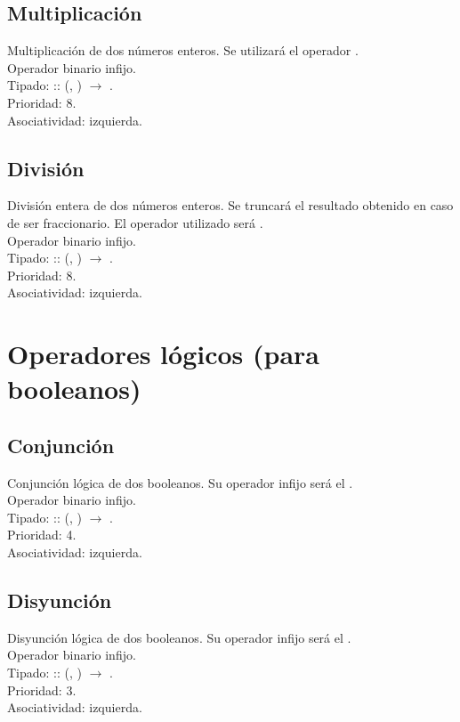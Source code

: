 \subsection*{Multiplicación}
Multiplicación de dos números enteros. Se utilizará el operador \Mul. 
\\Operador  binario infijo.
\\Tipado: \Mul :: (\Integer, \Integer) $\rightarrow$  \Integer. \\Prioridad: 8.
\\Asociatividad: izquierda.

\subsection*{División}
División entera de dos números enteros. Se truncará el resultado obtenido en caso de ser fraccionario. El operador utilizado será \Div. 
\\Operador  binario infijo.
\\Tipado: \Div :: 
(\Integer, \Integer) $\rightarrow$  \Integer. \\Prioridad: 8.
\\Asociatividad: izquierda.

\section{Operadores lógicos (para booleanos)}

\subsection*{Conjunción}
Conjunción lógica de dos booleanos. Su operador infijo será el \And. 
\\Operador  binario infijo.
\\Tipado: \And :: (\Boolean, \Boolean) $\rightarrow$ \Boolean. \\Prioridad: 4.
\\Asociatividad: izquierda.

\subsection*{Disyunción}
Disyunción lógica de dos booleanos. Su operador infijo será el \Or. 
\\Operador  binario infijo.
\\Tipado: \Or :: (\Boolean, \Boolean) $\rightarrow$ \Boolean. \\Prioridad: 3.
\\Asociatividad: izquierda.

